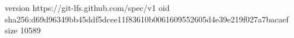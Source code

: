 version https://git-lfs.github.com/spec/v1
oid sha256:d69d96349bb45ddf5dcee11f83610b0061609552605d4e39e219f027a7bacaef
size 10589
